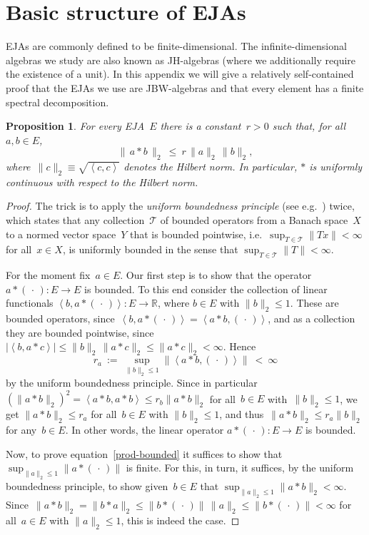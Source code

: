 \documentclass[submission,copyright,creativecommons]{eptcs}
\newcounter{main}
\newtheorem{proposition}[main]{Proposition}
\theoremstyle{definition}
\newcommand\R{\mathbb{R}}
\begin{document}




\appendix

\section{Basic structure of EJAs}
EJAs are commonly defined to be finite-dimensional. 
The infinite-dimensional algebras we study are also known as JH-algebras \cite{chu2017infinite,chu2011jordan}
(where we additionally require the existence of a unit). 
In this appendix we will give a relatively self-contained proof that the EJAs we use are JBW-algebras and that every element has a finite spectral decomposition.

\begin{proposition}
For every EJA~$E$
there is a constant~$r>0$ such that, for all~$a,b\in E$,
\begin{equation}
	\label{prod-bounded}
	\|\,a*b\,\|_2\ \leq\  r\,\|a\|_2\,\|b\|_2,
\end{equation}
where~$\|c\|_2 \equiv \sqrt{\left<c,c\right>}$
denotes the Hilbert norm.
In particular, $*$ is uniformly continuous with respect to the
Hilbert norm.
\end{proposition}
\begin{proof}
The trick is to apply
the \emph{uniform boundedness principle} (see e.g.~\cite{sokal2011})
twice,
which states that any collection~$\mathcal{T}$
of bounded operators
from a Banach space~$X$ to a normed vector space~$Y$
that is bounded pointwise,
i.e.~$\sup_{T\in\mathcal{T}} \|Tx\|<\infty$
for all~$x\in X$,
is uniformly bounded
in the sense that $\sup_{T\in \mathcal{T}} \|T\|<\infty$.

For the moment fix~$a\in E$.
Our first step is to show that the operator
	$a*(\,\cdot\,)\colon E\to E$ is bounded.
	To this end
 consider
the collection of linear functionals $\left<b,a*(\,\cdot\,)\right>
\colon E\to\R$,
where $b\in E$ with $\|b\|_2\leq 1$.
These are bounded operators,
since~$\left<b,a*(\,\cdot\,)\right>
= \left<a*b,(\,\cdot\,)\right>$,
and as a collection they 
are bounded pointwise,
since
$\left|\left<b,a*c\right>\right| \leq \|b\|_2\, \|a*c\|_2
\leq\|a*c\|_2<\infty$.
Hence 
\begin{equation*}
r_a\ :=\ \sup_{\|b\|_2\leq 1}\|
\left<a*b,(\,\cdot\,)\right>\|\ <\ \infty
\end{equation*}
by the uniform boundedness principle.
Since in particular
	$(\|a*b\|_2)^2 = \left<a*b,a*b\right>
\leq r_b\|a*b\|_2$ for all~$b\in E$ with~$\|b\|_2\leq 1$,
we get
$\|a*b\|_2\leq r_a$ for all~$b\in E$
with $\|b\|_2\leq 1$,
and thus~$\|a*b\|_2\leq r_a\|b\|_2$
for any~$b\in E$.
In other words,
the linear operator $a*(\,\cdot\,)\colon E\to E$
is bounded.

Now, to prove equation~\eqref{prod-bounded}
it suffices to show that $\sup_{\|a\|_2\leq 1} \|a*(\,\cdot\,)\|$ is finite.
For this, in turn,
it suffices,
by the uniform boundedness principle,
to show given~$b\in E$ that $\sup_{\|a\|_2\leq 1}\|a*b\|_2 <
	\infty$.
	Since~$\|a*b\|_2=\|b*a\|_2\leq \|b*(\,\cdot\,)\|\,
	\|a\|_2
	\leq \|b*(\,\cdot\,)\|<\infty$
	for all~$a\in E$ with $\|a\|_2\leq 1$,
	this is indeed the case.
\end{proof}
\end{document}

